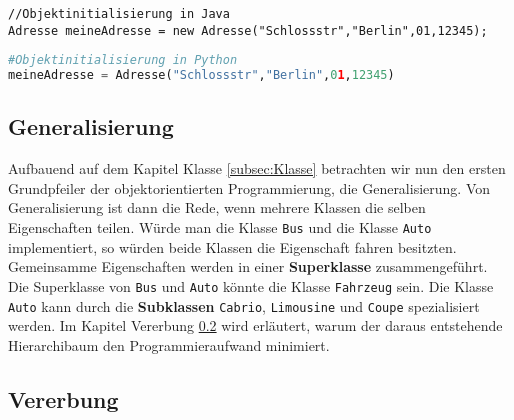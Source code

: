 \begin{lstlisting}[caption=Objektinitialisierung in Java, label=Konstruktor Java]
//Objektinitialisierung in Java
Adresse meineAdresse = new Adresse("Schlossstr","Berlin",01,12345);
\end{lstlisting}

\begin{lstlisting}[caption= Objektinitialisierung in Python, label=ObjektinitialisierungPython,language=Python]
#Objektinitialisierung in Python
meineAdresse = Adresse("Schlossstr","Berlin",01,12345)
\end{lstlisting}

\subsection{Generalisierung} \label{subsec:Generalisierung}

Aufbauend auf dem Kapitel Klasse \ref{subsec:Klasse} betrachten wir nun den ersten Grundpfeiler der objektorientierten Programmierung, die Generalisierung. Von Generalisierung ist dann die Rede, wenn mehrere Klassen die selben Eigenschaften teilen. Würde man die Klasse \texttt{Bus} und die Klasse \texttt{Auto} implementiert, so würden beide Klassen die Eigenschaft fahren besitzten. Gemeinsamme Eigenschaften werden in einer \textbf{Superklasse} zusammengeführt. Die Superklasse von \texttt{Bus} und \texttt{Auto} könnte die Klasse \texttt{Fahrzeug} sein. Die Klasse \texttt{Auto} kann durch die \textbf{Subklassen} \texttt{Cabrio}, \texttt{Limousine} und \texttt{Coupe} spezialisiert werden. Im Kapitel Vererbung \ref{subsec:Vererbung} wird erläutert, warum der daraus entstehende Hierarchibaum den Programmieraufwand minimiert. 


\subsection{Vererbung} \label{subsec:Vererbung}

